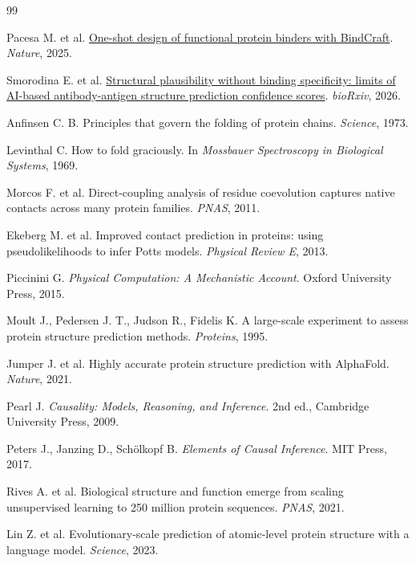 \documentclass[10pt]{article}
\begin{document}
\clearpage
\renewcommand{\refname}{参考文献}
\begin{thebibliography}{99}
\footnotesize
\setlength{\parskip}{0pt}
\setlength{\itemsep}{0.18em}

Pacesa M. et al. \href{https://doi.org/10.1038/s41586-025-09429-6}{One-shot design of functional protein binders with BindCraft}. \textit{Nature}, 2025.

Smorodina E. et al. \href{https://doi.org/10.64898/2026.03.02.709004}{Structural plausibility without binding specificity: limits of AI-based antibody-antigen structure prediction confidence scores}. \textit{bioRxiv}, 2026.

Anfinsen C. B. Principles that govern the folding of protein chains. \textit{Science}, 1973.

Levinthal C. How to fold graciously. In \textit{Mossbauer Spectroscopy in Biological Systems}, 1969.

Morcos F. et al. Direct-coupling analysis of residue coevolution captures native contacts across many protein families. \textit{PNAS}, 2011.

Ekeberg M. et al. Improved contact prediction in proteins: using pseudolikelihoods to infer Potts models. \textit{Physical Review E}, 2013.

Piccinini G. \textit{Physical Computation: A Mechanistic Account}. Oxford University Press, 2015.

Moult J., Pedersen J. T., Judson R., Fidelis K. A large-scale experiment to assess protein structure prediction methods. \textit{Proteins}, 1995.

Jumper J. et al. Highly accurate protein structure prediction with AlphaFold. \textit{Nature}, 2021.

Pearl J. \textit{Causality: Models, Reasoning, and Inference}. 2nd ed., Cambridge University Press, 2009.

Peters J., Janzing D., Sch{\"o}lkopf B. \textit{Elements of Causal Inference}. MIT Press, 2017.

Rives A. et al. Biological structure and function emerge from scaling unsupervised learning to 250 million protein sequences. \textit{PNAS}, 2021.

Lin Z. et al. Evolutionary-scale prediction of atomic-level protein structure with a language model. \textit{Science}, 2023.


\end{thebibliography}
\end{document}
